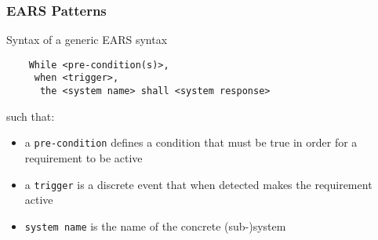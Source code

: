 \documentclass[aspectratio=169]{beamer}
\begin{document}
\begin{frame}[fragile]
  \frametitle{EARS Patterns}
  \begin{block}{Syntax of a generic EARS syntax}
    \begin{verbatim}
    While <pre-condition(s)>, 
     when <trigger>, 
      the <system name> shall <system response>  
    \end{verbatim}
    such that:
    \begin{itemize}
      \item a {\tt pre-condition} defines a condition that must be true in order for a requirement to be active
      \item a {\tt trigger} is a discrete event that when detected makes the requirement active
      \item {\tt system name} is the name of the concrete (sub{-})system 
    \end{itemize}
  \end{block}

\end{frame}
\end{document}
